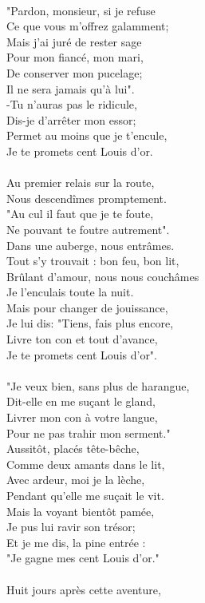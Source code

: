 \\"Pardon, monsieur, si je refuse
\\Ce que vous m'offrez galamment;
\\Mais j'ai juré de rester sage
\\Pour mon fiancé, mon mari,
\\De conserver mon pucelage;
\\Il ne sera jamais qu'à lui".
\\-Tu n'auras pas le ridicule,
\\Dis-je d'arrêter mon essor;
\\Permet au moins que je t'encule,
\\Je te promets cent Louis d'or.
\\\\Au premier relais sur la route,
\\Nous descendîmes promptement.
\\"Au cul il faut que je te foute,
\\Ne pouvant te foutre autrement".
\\Dans une auberge, nous entrâmes.
\\Tout s'y trouvait : bon feu, bon lit,
\\Brûlant d'amour, nous nous couchâmes
\\Je l'enculais toute la nuit.
\\Mais pour changer de jouissance,
\\Je lui dis: "Tiens, fais plus encore,
\\Livre ton con et tout d'avance,
\\Je te promets cent Louis d'or".
\\\\"Je veux bien, sans plus de harangue,
\\Dit-elle en me suçant le gland,
\\Livrer mon con à votre langue,
\\Pour ne pas trahir mon serment."
\\Aussitôt, placés tête-bêche,
\\Comme deux amants dans le lit,
\\Avec ardeur, moi je la lèche,
\\Pendant qu'elle me suçait le vit.
\\Mais la voyant bientôt pamée,
\\Je pus lui ravir son trésor;
\\Et je me dis, la pine entrée :
\\"Je gagne mes cent Louis d'or."
\\\\Huit jours après cette aventure,
